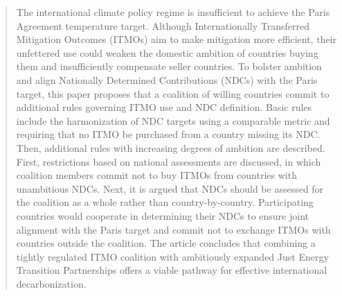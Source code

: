 \documentclass[12pt,english]{article}
\begin{document}
\begin{abstract} %
The %
international climate policy regime is insufficient to achieve the Paris Agreement temperature target. Although Internationally Transferred Mitigation Outcomes (ITMOs) aim to make mitigation more efficient, their unfettered use could weaken the domestic ambition of countries buying them and insufficiently compensate seller countries. To bolster ambition and align Nationally Determined Contributions (NDCs) with the Paris target, this paper proposes that a coalition of willing countries commit to additional rules governing ITMO use and NDC definition. Basic rules include the harmonization of NDC targets using a comparable metric and requiring that no ITMO be purchased from a country missing its NDC. Then, additional rules with increasing degrees of ambition are described. First, restrictions based on national assessments are discussed, in which coalition members commit not to buy ITMOs from countries with unambitious NDCs. Next, it is argued that NDCs should be assessed for the coalition as a whole rather than country-by-country. Participating countries would cooperate in determining their NDCs to ensure joint alignment with the Paris target and commit not to exchange ITMOs with countries outside the coalition. 
The article concludes that combining a tightly regulated ITMO coalition with ambitiously expanded Just Energy Transition Partnerships offers a viable pathway for effective international decarbonization.



\end{abstract}
\end{document}
